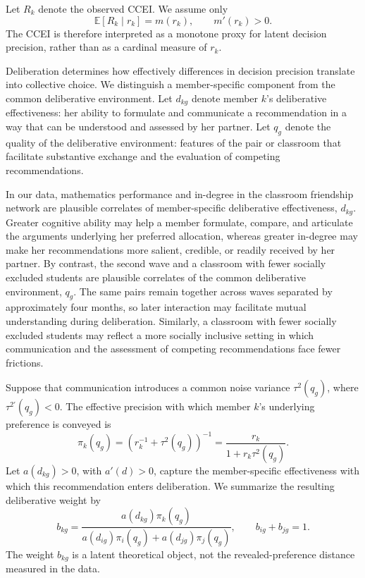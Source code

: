 \documentclass[11 pt]{article}
\begin{document}
Let $R_k$ denote the observed CCEI. We assume only
\begin{equation}
    \mathbb{E}[R_k\mid r_k]=m(r_k),
    \qquad m'(r_k)>0.
    \label{eq:ccei_precision_appendix}
\end{equation}
The CCEI is therefore interpreted as a monotone proxy for latent decision precision, rather than as a cardinal measure of $r_k$.

Deliberation determines how effectively differences in decision precision translate into collective choice. We distinguish a member-specific component from the common deliberative environment. Let $d_{kg}$ denote member $k$'s deliberative effectiveness: her ability to formulate and communicate a recommendation in a way that can be understood and assessed by her partner. Let $q_g$ denote the quality of the deliberative environment: features of the pair or classroom that facilitate substantive exchange and the evaluation of competing recommendations.

In our data, mathematics performance and in-degree in the classroom friendship network are plausible correlates of member-specific deliberative effectiveness, $d_{kg}$. Greater cognitive ability may help a member formulate, compare, and articulate the arguments underlying her preferred allocation, whereas greater in-degree may make her recommendations more salient, credible, or readily received by her partner. By contrast, the second wave and a classroom with fewer socially excluded students are plausible correlates of the common deliberative environment, $q_g$. The same pairs remain together across waves separated by approximately four months, so later interaction may facilitate mutual understanding during deliberation. Similarly, a classroom with fewer socially excluded students may reflect a more socially inclusive setting in which communication and the assessment of competing recommendations face fewer frictions.

Suppose that communication introduces a common noise variance $\tau^2(q_g)$, where $\tau^{2\prime}(q_g)<0$. The effective precision with which member $k$'s underlying preference is conveyed is
\begin{equation}
    \pi_k(q_g)=\left(r_k^{-1}+\tau^2(q_g)\right)^{-1}
    =\frac{r_k}{1+r_k\tau^2(q_g)}.
    \label{eq:effective_precision}
\end{equation}
Let $a(d_{kg})>0$, with $a'(d)>0$, capture the member-specific effectiveness with which this recommendation enters deliberation. We summarize the resulting deliberative weight by
\begin{equation}
    b_{kg}=\frac{a(d_{kg})\pi_k(q_g)}{a(d_{ig})\pi_i(q_g)+a(d_{jg})\pi_j(q_g)},
    \qquad b_{ig}+b_{jg}=1.
    \label{eq:deliberative_weight}
\end{equation}
The weight $b_{kg}$ is a latent theoretical object, not the revealed-preference distance measured in the data.
\end{document}
